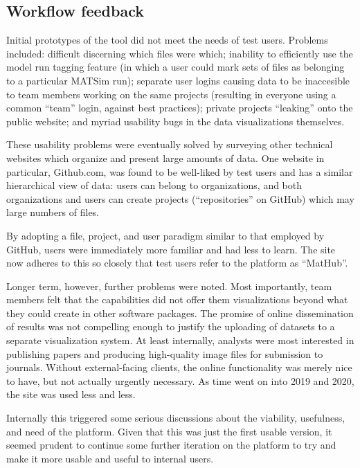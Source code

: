 \hypertarget{mathub-workflow-feedback}{%
\subsection{Workflow feedback}\label{workflow-feedback}}

Initial prototypes of the tool did not meet the needs of test users. Problems included: difficult discerning which files were which; inability to efficiently use the model run tagging feature (in which a user could mark sets of files as belonging to a particular MATSim run); separate user logins causing data to be inaccesible to team members working on the same projects (resulting in everyone using a common ``team'' login, against best practices); private projects ``leaking'' onto the public website; and myriad usability bugs in the data visualizations themselves.

These usability problems were eventually solved by surveying other technical websites which organize and present large amounts of data. One website in particular, Github.com, was found to be well-liked by test users and has a similar hierarchical view of data: users can belong to organizations, and both organizations and users can create projects (``repositories'' on GitHub) which may large numbers of files.

By adopting a file, project, and user paradigm similar to that employed by GitHub, users were immediately more familiar and had less to learn. The site now adheres to this so closely that test users refer to the platform as ``MatHub''.

Longer term, however, further problems were noted. Most importantly, team members felt that the capabilities did not offer them visualizations beyond what they could create in other software packages. The promise of online dissemination of results was not compelling enough to justify the uploading of datasets to a separate visualization system. At least internally, analysts were most interested in publishing papers and producing high-quality image files for submission to journals. Without external-facing clients, the online functionality was merely nice to have, but not actually urgently necessary. As time went on into 2019 and 2020, the site was used less and less.

Internally this triggered some serious discussions about the viability, usefulness, and need of the platform. Given that this was just the first usable version, it seemed prudent to continue some further iteration on the platform to try and make it more usable and useful to internal users.

